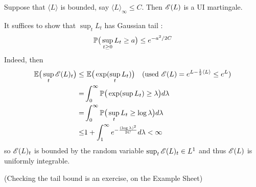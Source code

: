 \documentclass[10pt,a4paper]{article}
\newenvironment{proof}
{\begin{changemargin}{0.5cm}{0.5cm} 
	}%
	{\end{changemargin}
}
\newenvironment{p}
{\begin{proof} 
	}%
	{\end{proof}
}
\begin{document}
\prop Suppose that $\langle L \rangle$ is bounded, say $\langle L \rangle_{\infty} \leq C$. Then $\mathscr{E}(L)$ is a UI martingale.
\begin{p}
\pf It suffices to show that $\sup_t L_t$ has Gaussian tail :
\begin{align*}
\mathbb{P} \big( \sup_{t\geq 0} L_t \geq a \big) \leq e^{-a^2 /2C}
\end{align*}
Indeed, then
\begin{align*}
\mathbb{E} \big(  \sup_t \mathscr{E}(L)_t \big) \leq& \,\, \mathbb{E} \big( \exp (\sup_t L_t ) \big) \quad (\text{used } \mathscr{E}(L) = e^{L - \frac{1}{2} \langle L \rangle}  \leq e^L) \\
=& \int_0^{\infty} \mathbb{P} \big( \exp (\sup L_t) \geq \lambda \big) d\lambda \\
=& \int_0^{\infty} \mathbb{P} \big( \sup_t L_t \geq \log \lambda \big) d\lambda \\
\leq& 1+ \int_1^{\infty} e^{- \frac{(\log \lambda)^2}{2C}} d\lambda < \infty
\end{align*}
so $\mathscr{E}(L)_t$ is bounded by the random variable $\sup_t \mathscr{E}(L)_t \in L^1$ and thus $\mathscr{E}(L)$ is uniformly integrable.
\s

(Checking the tail bound is an exercise, on the Example Sheet)


\end{p}
\end{document}
